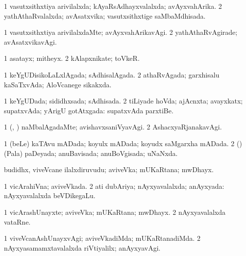 \bentry
{} 
\gl{\gu}
\expl{}
\bmng
\bnum
\num{1} vasutxsithxtiya arivilalxda; kAyaRsAdhayxvalalxda; avAyxvahArika. 
\num{2} yathAthaRvalalxda; avAsatxvika; vasutxsithxtige saMbaMdhisada. 
\enum
\emng
\eentry

\bentry
{} 
\gl{\kirxvi}
\expl{}
\bmng
\bnum
\num{1} vasutxsithxtiya arivilalxdaMte; avAyxvahArikavAgi. 
\num{2} yathAthaRvAgirade; avAsatxvikavAgi. 
\enum
\emng
\eentry

\bentry
{} 
\gl{\nA}
\expl{}
\bmng
\bnum
\num{1} asatayx; mitheyx. 
\num{2} kAlapxnikate; toVkeR. 
\enum
\emng
\eentry

\bentry
{} 
\gl{\gu}
\expl{}
\bmng
\bnum
\num{1} keYgUDisikoLaLxlAgada; sAdhisalAgada. 
\num{2} athaRvAgada; garxhisalu kaSaTxvAda; AloVcanege sikakxda. 
\enum
\emng
\eentry

\bentry
{} 
\gl{\gu}
\expl{}
\bmng
\bnum
\num{1} keYgUDada; sididhxsada; sAdhisada. 
\num{2} tiLiyade hoVda; ajAcnxta; avayxkatx; supatxvAda; yArigU gotAtxgada:  supatxvAda parxtiBe. 
\enum
\emng
\eentry

\bentry
{} 
\gl{\kirxvi}
\expl{}
\bmng
\bnum
\num{1} (\ame, \ashi) naMbalAgadaMte; avishavxsaniVyavAgi. 
\num{2} AshacxyaRjanakavAgi. 
\enum
\emng
\eentry

\bentry
{} 
\gl{\gu}
\expl{}
\bmng
\bnum
\num{1} (beLe) kaTAvu mADada; koyulx mADada; koyudx saMgarxha mADada. 
\num{2} (\rUpa) (Pala) paDeyada; anuBavisada; anuBoVgisada; uNaNxda. 
\enum
\emng
\eentry

\bentry
{} 
\gl{\nA}
\expl{}
\bmng
budidhx, viveVcane ilalxdiruvudu; aviveVka; mUKaRtana; mwDhayx. 
\emng
\eentry

\bentry
{} 
\gl{\gu}
\expl{}
\bmng
\bnum
\num{1} vicArahiVna; aviveVkada. 
\num{2} ati dubAriya; nAyxyavalalxda; anAyxyada:  nAyxyavalalxda beVDikegaLu. 
\enum
\emng
\eentry

\bentry
{} 
\gl{\nA}
\expl{}
\bmng
\bnum
\num{1} vicArashUnayxte; aviveVka; mUKaRtana; mwDhayx. 
\num{2} nAyxyavalalxda vataRne. 
\enum
\emng
\eentry

\bentry
{} 
\gl{\kirxvi}
\expl{}
\bmng
\bnum
\num{1} viveVcanAshUnayxvAgi; aviveVkadiMda; mUKaRtanadiMda. 
\num{2} nAyxyasamamxtavalalxda riVtiyalilx; anAyxyavAgi. 
\enum
\emng
\eentry

